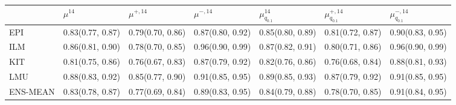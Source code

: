 \begin{tabular}{l p{} p{} p{} p{} p{} p{}}
\toprule
 & $\mu^{14}$ & $\mu^{+, 14}$ & $\mu^{-, 14}$ & $\mu^{14}_{q_{0.1}}$ & $\mu^{+, 14}_{q_{0.1}}$ & $\mu^{-, 14}_{q_{0.1}}$ \\
\midrule
EPI & {0.83\newline(0.77, 0.87)} & {0.79\newline(0.70, 0.86)} & {0.87\newline(0.80, 0.92)} & {0.85\newline(0.80, 0.89)} & {0.81\newline(0.72, 0.87)} & {0.90\newline(0.83, 0.95)} \\
ILM & {0.86\newline(0.81, 0.90)} & {0.78\newline(0.70, 0.85)} & {0.96\newline(0.90, 0.99)} & {0.87\newline(0.82, 0.91)} & {0.80\newline(0.71, 0.86)} & {0.96\newline(0.90, 0.99)} \\
KIT & {0.81\newline(0.75, 0.86)} & {0.76\newline(0.67, 0.83)} & {0.87\newline(0.79, 0.92)} & {0.82\newline(0.76, 0.86)} & {0.76\newline(0.68, 0.84)} & {0.88\newline(0.81, 0.93)} \\
LMU & {0.88\newline(0.83, 0.92)} & {0.85\newline(0.77, 0.90)} & {0.91\newline(0.85, 0.95)} & {0.89\newline(0.85, 0.93)} & {0.87\newline(0.79, 0.92)} & {0.91\newline(0.85, 0.95)} \\
ENS-MEAN & {0.83\newline(0.78, 0.87)} & {0.77\newline(0.69, 0.84)} & {0.89\newline(0.83, 0.95)} & {0.84\newline(0.79, 0.88)} & {0.78\newline(0.70, 0.85)} & {0.91\newline(0.84, 0.95)} \\

\end{tabular}
